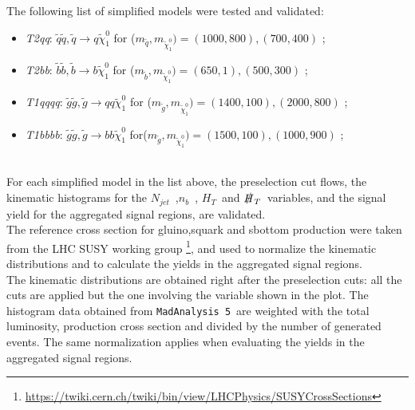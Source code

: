 \documentclass[12pt,A4paper
english, %
singlespacing, %
parskip, %
headsepline, %
]{article}
\newcommand{\MHT}{ $\slashed H _T$}
\newcommand{\HT}{ $ H _T$}
\newcommand{\NJETS}{$N_{jet}$}
\newcommand{\NB}{$n_b$}
\newcommand{\MAD}{\texttt{MadAnalysis 5}}
\begin{document}
The following list of simplified models were tested and validated:
\begin{itemize}
\item \textit{T2qq}: $\tilde{q}\tilde{q}, \tilde{q} \rightarrow q  \tilde{\chi}_{1}^{0}$ for  ($m_{\tilde{q}} , m_{\tilde{\chi}_1^0}) = (1000,800) , (700,400)$ ;
\item \textit{T2bb}: $\tilde{b}\tilde{b}, \tilde{b} \rightarrow b  \tilde{\chi}_{1}^{0}$ for ($m_{\tilde{b}} , m_{\tilde{\chi}_1^0}) = (650,1) , (500,300)$ ;
\item \textit{T1qqqq}: $\tilde{g}\tilde{g}, \tilde{g} \rightarrow qq \tilde{\chi}^{0}_{1}$ for ($m_{\tilde{g}} , m_{\tilde{\chi}_1^0}) = (1400,100) , (2000,800)$ ;
\item \textit{T1bbbb}: $\tilde{g}\tilde{g}, \tilde{g} \rightarrow bb \tilde{\chi}^{0}_{1}$ for($m_{\tilde{g}} , m_{\tilde{\chi}_1^0}) = (1500,100) , (1000,900)$ ;
\end{itemize}
\\

For each simplified model in the list above, the preselection cut flows, the kinematic histograms for the \NJETS~,\NB~,\HT~and \MHT~variables, and the signal yield for the aggregated signal regions, are validated. 
\\

The reference cross section for gluino,squark and sbottom production were taken from the LHC SUSY working group \footnote{\url{https://twiki.cern.ch/twiki/bin/view/LHCPhysics/SUSYCrossSections}}, and used to normalize the kinematic distributions and to calculate the yields in the aggregated signal regions.
\\

The kinematic distributions are obtained right after the preselection cuts: all the cuts are applied but the one involving the variable shown in the plot. The histogram data obtained from \MAD~are weighted with the total luminosity, production cross section and divided by the number of generated events. The same normalization applies when evaluating the yields in the aggregated signal regions.
\end{document}
